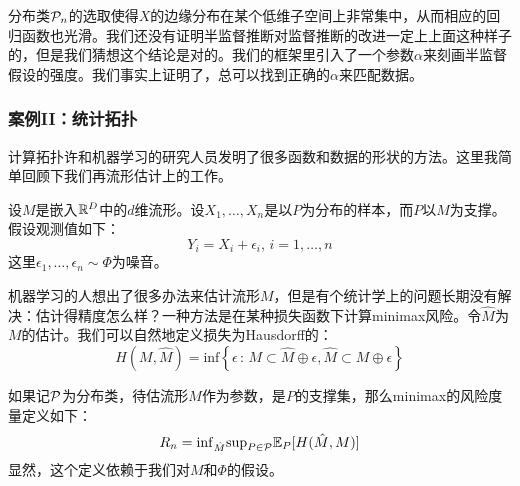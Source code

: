\documentclass[]{article}
\begin{document}
分布类${\mathcal{P}}_n$的选取使得$X$的边缘分布在某个低维子空间上非常集中，从而相应的回归函数也光滑。我们还没有证明半监督推断对监督推断的改进一定上上面这种样子的，但是我们猜想这个结论是对的。我们的框架里引入了一个参数$\alpha$来刻画半监督假设的强度。我们事实上证明了，总可以找到正确的$\alpha$来匹配数据。

\subsubsection{案例II：统计拓扑}
计算拓扑许和机器学习的研究人员发明了很多函数和数据的形状的方法。这里我简单回顾下我们再流形估计上的工作\cite{wass2012a,wass2012b,wass2012c}。

设$M$是嵌入${\mathbb{R}}^D$中的$d$维流形。设$X_1,\ldots,X_n$是以$P$为分布的样本，而$P$以$M$为支撑。假设观测值如下：
$$  Y_i = X_i + \epsilon_i, \, i=1,\ldots,n $$
这里$\epsilon_1,\ldots,\epsilon_n \sim \Phi$为噪音。

机器学习的人想出了很多办法来估计流形$M$，但是有个统计学上的问题长期没有解决：估计得精度怎么样？一种方法是在某种损失函数下计算minimax风险。令$\hat{M}$为$M$的估计。我们可以自然地定义损失为Hausdorff的：
$$ H(M,\hat{M}) = \mathrm{inf} \left\{ \epsilon \, : \, M \subset \hat{M} \oplus \epsilon , \hat{M} \subset M \oplus \epsilon \right\} $$

如果记${\mathcal{P}}$为分布类，待估流形$M$作为参数，是$P$的支撑集，那么minimax的风险度量定义如下：
$$ R_n = \mathrm{inf}_{\hat{M}} \mathrm{sup}_{P \in {\mathcal{P}}} {\mathbb{E}}_P [ H(\hat{M}, M) ] $$
显然，这个定义依赖于我们对$M$和$\Phi$的假设。






\end{document}
